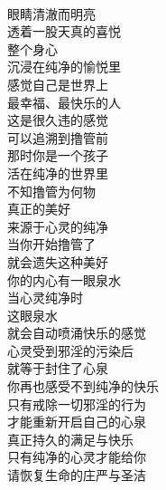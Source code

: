 \begin{poem}[心泉]
    \begin{multicols}{2}
        \begin{center}~\\
            眼睛清澈而明亮 \\ 透着一股天真的喜悦 \\ 整个身心 \\ 沉浸在纯净的愉悦里 \\ 感觉自己是世界上 \\ 最幸福、最快乐的人 \\ 这是很久违的感觉 \\ 可以追溯到撸管前 \\ 那时你是一个孩子 \\ 活在纯净的世界里 \\ 不知撸管为何物 \\ 真正的美好 \\ 来源于心灵的纯净 \\ 当你开始撸管了 \\ 就会遗失这种美好 \\ 你的内心有一眼泉水 \\ 当心灵纯净时 \\ 这眼泉水 \\ 就会自动喷涌快乐的感觉 \\ 心灵受到邪淫的污染后 \\ 就等于封住了心泉 \\ 你再也感受不到纯净的快乐 \\ 只有戒除一切邪淫的行为 \\ 才能重新开启自己的心泉 \\ 真正持久的满足与快乐 \\ 只有纯净的心灵才能给你 \\ 请恢复生命的庄严与圣洁
        \end{center}
    \end{multicols}
\end{poem}


